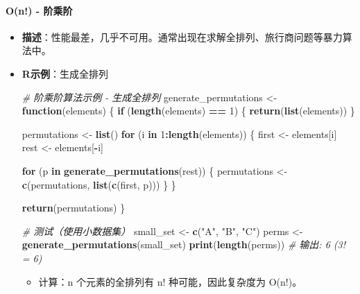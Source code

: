 \documentclass[
  twoside]{book}
\newenvironment{Shaded}{\begin{snugshade}}{\end{snugshade}}
\newcommand{\CommentTok}[1]{\textcolor[rgb]{0.56,0.35,0.01}{\textit{#1}}}
\newcommand{\ControlFlowTok}[1]{\textcolor[rgb]{0.13,0.29,0.53}{\textbf{#1}}}
\newcommand{\DecValTok}[1]{\textcolor[rgb]{0.00,0.00,0.81}{#1}}
\newcommand{\FunctionTok}[1]{\textcolor[rgb]{0.13,0.29,0.53}{\textbf{#1}}}
\newcommand{\NormalTok}[1]{#1}
\newcommand{\OtherTok}[1]{\textcolor[rgb]{0.56,0.35,0.01}{#1}}
\newcommand{\SpecialCharTok}[1]{\textcolor[rgb]{0.81,0.36,0.00}{\textbf{#1}}}
\newcommand{\StringTok}[1]{\textcolor[rgb]{0.31,0.60,0.02}{#1}}
\providecommand{\tightlist}{%
  \setlength{\itemsep}{0pt}\setlength{\parskip}{0pt}}
\begin{document}
\hypertarget{on---ux9636ux4e58ux9636}{%
\paragraph{O(n!) - 阶乘阶}\label{on---ux9636ux4e58ux9636}}

\begin{itemize}
\item
  \textbf{描述}：性能最差，几乎不可用。通常出现在求解全排列、旅行商问题等暴力算法中。
\item
  \textbf{R示例}：生成全排列

\begin{Shaded}
\begin{Highlighting}[]
\CommentTok{\# 阶乘阶算法示例 {-} 生成全排列}
\NormalTok{generate\_permutations }\OtherTok{\textless{}{-}} \ControlFlowTok{function}\NormalTok{(elements) \{}
  \ControlFlowTok{if}\NormalTok{ (}\FunctionTok{length}\NormalTok{(elements) }\SpecialCharTok{==} \DecValTok{1}\NormalTok{) \{}
    \FunctionTok{return}\NormalTok{(}\FunctionTok{list}\NormalTok{(elements))}
\NormalTok{  \}}

\NormalTok{  permutations }\OtherTok{\textless{}{-}} \FunctionTok{list}\NormalTok{()}
  \ControlFlowTok{for}\NormalTok{ (i }\ControlFlowTok{in} \DecValTok{1}\SpecialCharTok{:}\FunctionTok{length}\NormalTok{(elements)) \{}
\NormalTok{    first }\OtherTok{\textless{}{-}}\NormalTok{ elements[i]}
\NormalTok{    rest }\OtherTok{\textless{}{-}}\NormalTok{ elements[}\SpecialCharTok{{-}}\NormalTok{i]}

    \ControlFlowTok{for}\NormalTok{ (p }\ControlFlowTok{in} \FunctionTok{generate\_permutations}\NormalTok{(rest)) \{}
\NormalTok{      permutations }\OtherTok{\textless{}{-}} \FunctionTok{c}\NormalTok{(permutations, }\FunctionTok{list}\NormalTok{(}\FunctionTok{c}\NormalTok{(first, p)))}
\NormalTok{    \}}
\NormalTok{  \}}

  \FunctionTok{return}\NormalTok{(permutations)}
\NormalTok{\}}

\CommentTok{\# 测试（使用小数据集）}
\NormalTok{small\_set }\OtherTok{\textless{}{-}} \FunctionTok{c}\NormalTok{(}\StringTok{"A"}\NormalTok{, }\StringTok{"B"}\NormalTok{, }\StringTok{"C"}\NormalTok{)}
\NormalTok{perms }\OtherTok{\textless{}{-}} \FunctionTok{generate\_permutations}\NormalTok{(small\_set)}
\FunctionTok{print}\NormalTok{(}\FunctionTok{length}\NormalTok{(perms))  }\CommentTok{\# 输出: 6 (3! = 6)}
\end{Highlighting}
\end{Shaded}

  \begin{itemize}
  \tightlist
  \item
    计算：n 个元素的全排列有 n! 种可能，因此复杂度为 O(n!)。
  \end{itemize}
\end{itemize}
\end{document}
